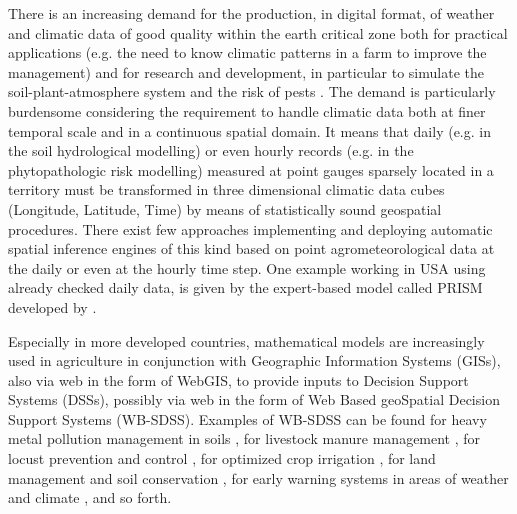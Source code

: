 \documentclass[authoryear,preprint,review,12pt]{elsarticle}
\newcommand{\note}[1]{\emph{\textcolor{red}{#1}}}
\newcommand{\review}[1]{\emph{\textcolor{cyan}{#1}}}
\begin{document}
There is an increasing demand for the production, in digital format, of weather and climatic data of good quality within the earth critical zone both 
    for practical applications (e.g. the need to know climatic patterns in a farm to improve the management)
    and
    for research and development, in particular to simulate the soil-plant-atmosphere system \citep{Hoogenboom:agrometeo-swat:2000,Jones:swat:2003,Seneviratne:swat:2010} %
    and the risk of pests \citep{Orlandini:plasmopara:2008,Rossi:vitenet:2014}.
The demand is particularly burdensome considering the requirement to handle climatic data both at finer temporal scale and in a continuous spatial domain.
It means that daily (e.g. in the soil hydrological modelling) or even hourly records (e.g. in the phytopathologic risk modelling) measured at point gauges sparsely located in a territory must be transformed in three dimensional climatic data cubes (Longitude, Latitude, Time) by means of statistically sound geospatial procedures.
There exist few approaches implementing and deploying automatic spatial inference engines of this kind based on point agrometeorological data at the daily or even at the hourly time step.
One example working in USA using already checked daily data, is given by the expert-based model called PRISM developed by  \cite{Daly08_PRISM_USA}. %

Especially in more developed countries, mathematical models are increasingly used in agriculture in conjunction with Geographic Information Systems (GISs), also via web in the form of WebGIS, to provide inputs to Decision Support Systems (DSSs), possibly via web in the form of Web Based geoSpatial Decision Support Systems (WB-SDSS).
Examples of WB-SDSS can be found 
for heavy metal pollution management in soils \citep{Wang:wbsdss:2005}, 
for livestock manure management \citep{Acutis:wbsdss:2014}, 
for locust prevention and control \citep{Yao:wbsdss:2017}, 
for optimized crop irrigation \citep{Giusti:wbsdss:2015}, 
for land management and soil conservation \citep{Terribile:soilconsweb:2015}, 
for early warning systems in areas of weather and climate \citep{Bopape_2019},
and so forth.
\end{document}
